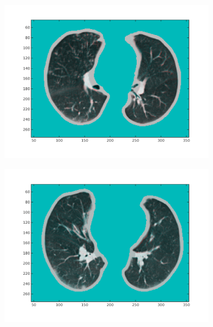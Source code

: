 \documentclass[11pt,a4paper,oneside]{report}
\begin{document}
\begin{figure}[H]
\begin{subfigure}[b]{0.3\textwidth}
                \includegraphics[width=\textwidth, trim=20 20 20 20]{figures/reg1/reg2_5_60.png}
        \end{subfigure}
        \begin{subfigure}[b]{0.3\textwidth}
                \includegraphics[width=\textwidth, trim=20 20 20 20]{figures/reg1/reg3_2_49.png}
        \end{subfigure}
        


\end{figure}
\end{document}
